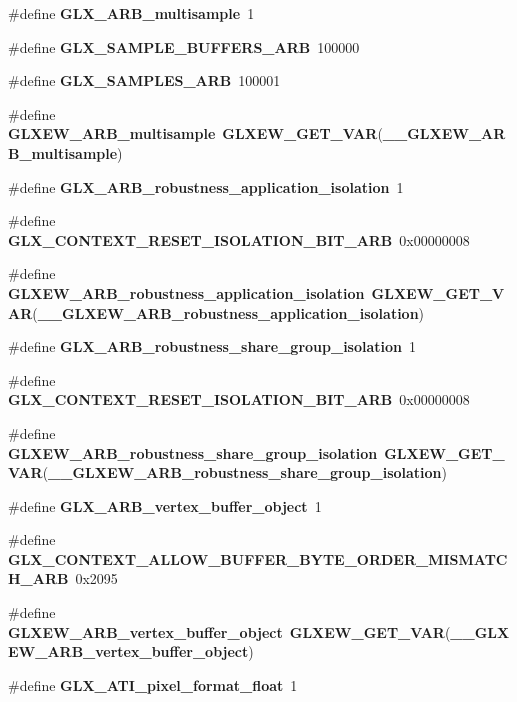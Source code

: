 \begin{DoxyCompactItemize}
\item 
\#define {\bf G\+L\+X\+\_\+\+A\+R\+B\+\_\+multisample}~1
\item 
\#define {\bf G\+L\+X\+\_\+\+S\+A\+M\+P\+L\+E\+\_\+\+B\+U\+F\+F\+E\+R\+S\+\_\+\+A\+RB}~100000
\item 
\#define {\bf G\+L\+X\+\_\+\+S\+A\+M\+P\+L\+E\+S\+\_\+\+A\+RB}~100001
\item 
\#define {\bf G\+L\+X\+E\+W\+\_\+\+A\+R\+B\+\_\+multisample}~{\bf G\+L\+X\+E\+W\+\_\+\+G\+E\+T\+\_\+\+V\+AR}({\bf \+\_\+\+\_\+\+G\+L\+X\+E\+W\+\_\+\+A\+R\+B\+\_\+multisample})
\item 
\#define {\bf G\+L\+X\+\_\+\+A\+R\+B\+\_\+robustness\+\_\+application\+\_\+isolation}~1
\item 
\#define {\bf G\+L\+X\+\_\+\+C\+O\+N\+T\+E\+X\+T\+\_\+\+R\+E\+S\+E\+T\+\_\+\+I\+S\+O\+L\+A\+T\+I\+O\+N\+\_\+\+B\+I\+T\+\_\+\+A\+RB}~0x00000008
\item 
\#define {\bf G\+L\+X\+E\+W\+\_\+\+A\+R\+B\+\_\+robustness\+\_\+application\+\_\+isolation}~{\bf G\+L\+X\+E\+W\+\_\+\+G\+E\+T\+\_\+\+V\+AR}({\bf \+\_\+\+\_\+\+G\+L\+X\+E\+W\+\_\+\+A\+R\+B\+\_\+robustness\+\_\+application\+\_\+isolation})
\item 
\#define {\bf G\+L\+X\+\_\+\+A\+R\+B\+\_\+robustness\+\_\+share\+\_\+group\+\_\+isolation}~1
\item 
\#define {\bf G\+L\+X\+\_\+\+C\+O\+N\+T\+E\+X\+T\+\_\+\+R\+E\+S\+E\+T\+\_\+\+I\+S\+O\+L\+A\+T\+I\+O\+N\+\_\+\+B\+I\+T\+\_\+\+A\+RB}~0x00000008
\item 
\#define {\bf G\+L\+X\+E\+W\+\_\+\+A\+R\+B\+\_\+robustness\+\_\+share\+\_\+group\+\_\+isolation}~{\bf G\+L\+X\+E\+W\+\_\+\+G\+E\+T\+\_\+\+V\+AR}({\bf \+\_\+\+\_\+\+G\+L\+X\+E\+W\+\_\+\+A\+R\+B\+\_\+robustness\+\_\+share\+\_\+group\+\_\+isolation})
\item 
\#define {\bf G\+L\+X\+\_\+\+A\+R\+B\+\_\+vertex\+\_\+buffer\+\_\+object}~1
\item 
\#define {\bf G\+L\+X\+\_\+\+C\+O\+N\+T\+E\+X\+T\+\_\+\+A\+L\+L\+O\+W\+\_\+\+B\+U\+F\+F\+E\+R\+\_\+\+B\+Y\+T\+E\+\_\+\+O\+R\+D\+E\+R\+\_\+\+M\+I\+S\+M\+A\+T\+C\+H\+\_\+\+A\+RB}~0x2095
\item 
\#define {\bf G\+L\+X\+E\+W\+\_\+\+A\+R\+B\+\_\+vertex\+\_\+buffer\+\_\+object}~{\bf G\+L\+X\+E\+W\+\_\+\+G\+E\+T\+\_\+\+V\+AR}({\bf \+\_\+\+\_\+\+G\+L\+X\+E\+W\+\_\+\+A\+R\+B\+\_\+vertex\+\_\+buffer\+\_\+object})
\item 
\#define {\bf G\+L\+X\+\_\+\+A\+T\+I\+\_\+pixel\+\_\+format\+\_\+float}~1
\item 

\end{DoxyCompactItemize}
